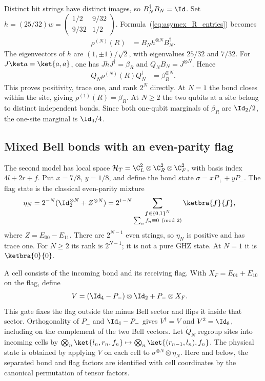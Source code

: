 Distinct bit strings have distinct images, so $B_N^\dagger B_N=\Id$.
Set $h=(25/32)w=
    \left(\begin{smallmatrix}1/2&9/32\\9/32&1/2\end{smallmatrix}\right)$.
Formula~(\ref{eq:asymex_R_entries}) becomes
\begin{align}
    \rho^{(N)}(R) & =B_Nh^{\otimes N}B_N^\dagger.
    \label{eq:asymex_R_isometry}
\end{align}
The eigenvectors of $h$ are $(1,\pm1)/\sqrt2$, with eigenvalues $25/32$
and $7/32$. For $J\ket a=\ket{a,a}$, one has
$JhJ^\dagger=\beta_R$ and $Q_NB_N=J^{\otimes N}$. Hence
\begin{align}
    Q_N\rho^{(N)}(R)Q_N^\dagger & =\beta_R^{\otimes N}.
    \label{eq:asymex_R_density}
\end{align}
This proves positivity, trace one, and rank $2^N$ directly. At $N=1$ the
bond closes within the site, giving $\rho^{(1)}(R)=\beta_R$. At $N\ge2$
the two qubits at a site belong to distinct independent bonds. Since both
one-qubit marginals of $\beta_R$ are $\Id_2/2$, the one-site marginal is
$\Id_4/4$.

\subsection{Mixed Bell bonds with an even-parity flag}

The second model has local space
$\mathcal H_T=\C^2_L\otimes\C^2_R\otimes\C^2_F$, with basis index
$4l+2r+f$. Put $x=7/8$, $y=1/8$, and define the bond state
$\sigma=xP_++yP_-$. The flag state is the classical even-parity mixture
\begin{align}
    \eta_N
     & =2^{-N}(\Id_2^{\otimes N}+Z^{\otimes N})
    =2^{1-N}\sum_{\substack{\boldsymbol f\in\{0,1\}^N \\
            \sum_n f_n\equiv0\pmod2}}
    \ketbra{\boldsymbol f}{\boldsymbol f},
    \label{eq:asymex_even_flags}
\end{align}
where $Z=E_{00}-E_{11}$. There are $2^{N-1}$ even strings, so
$\eta_N$ is positive and has trace one. For $N\ge2$ its rank is
$2^{N-1}$; it is not a pure GHZ state. At $N=1$ it is $\ketbra{0}{0}$.

A cell consists of the incoming bond and its receiving flag. With
$X_F=E_{01}+E_{10}$ on the flag, define
\begin{align}
    V & =(\Id_4-P_-)\otimes\Id_2+P_-\otimes X_F.
    \label{eq:asymex_flag_gate}
\end{align}
This gate fixes the flag outside the minus Bell sector and flips it
inside that sector. Orthogonality of $P_-$ and $\Id_4-P_-$ gives
$V^\dagger=V$ and $V^2=\Id_8$, including on the complement of the two
Bell vectors. Let $\widetilde Q_N$ regroup sites into incoming cells by
$\bigotimes_n\ket{l_n,r_n,f_n}\mapsto
    \bigotimes_n\ket{(r_{n-1},l_n),f_n}$.
The physical state is obtained by applying $V$ on each cell to
$\sigma^{\otimes N}\otimes\eta_N$. Here and below, the separated bond
and flag factors are identified with cell coordinates by the canonical
permutation of tensor factors.

